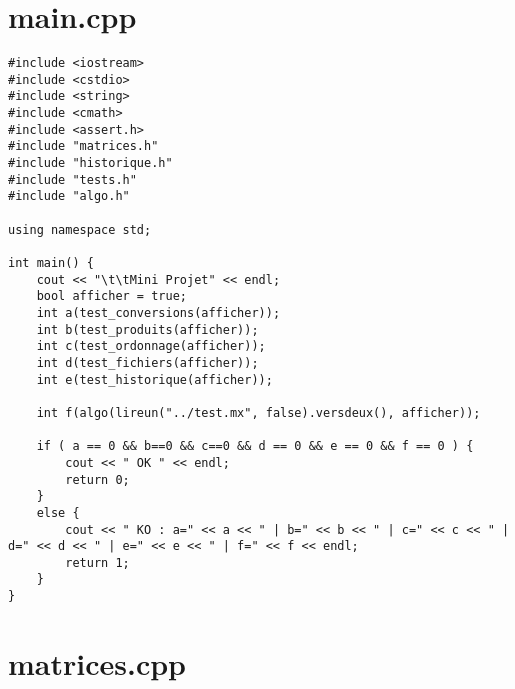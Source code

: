 \documentclass[a4paper]{article}
\begin{document}
\section{main.cpp}
\begin{verbatim}
#include <iostream>
#include <cstdio>
#include <string>
#include <cmath>
#include <assert.h>
#include "matrices.h"
#include "historique.h"
#include "tests.h"
#include "algo.h"

using namespace std;

int main() {
    cout << "\t\tMini Projet" << endl;
    bool afficher = true;
    int a(test_conversions(afficher));
    int b(test_produits(afficher));
    int c(test_ordonnage(afficher));
    int d(test_fichiers(afficher));
    int e(test_historique(afficher));

    int f(algo(lireun("../test.mx", false).versdeux(), afficher));
    
    if ( a == 0 && b==0 && c==0 && d == 0 && e == 0 && f == 0 ) {
        cout << " OK " << endl;
        return 0;
    }
    else {
        cout << " KO : a=" << a << " | b=" << b << " | c=" << c << " | d=" << d << " | e=" << e << " | f=" << f << endl; 
        return 1;
    }
}
\end{verbatim}



\section{matrices.cpp}
\end{document}
